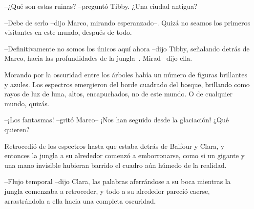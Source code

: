 {--¿Qué son estas ruinas? --preguntó Tibby. ¿Una ciudad antigua?}

{--Debe de serlo --dijo Marco, mirando esperanzado--. Quizá no seamos los
primeros visitantes en este mundo, después de todo.}

{--Definitivamente no somos los únicos aquí ahora --dijo Tibby, señalando
 detrás de Marco, hacia las profundidades de la jungla--. Mirad --dijo
ella.}

{Morando por la oscuridad entre los árboles había un número de figuras
 brillantes y azules. Los espectros emergieron del borde cuadrado del
 bosque, brillando como rayos de luz de luna, altos, encapuchados, no de
este mundo. O de cualquier mundo, quizás.}

{--¡Los fantasmas! --gritó Marco-- ¡Nos han seguido desde la glaciación!
¿Qué quieren?}

{Retrocedió de los espectros hasta que estaba detrás de Balfour y Clara,
 y entonces la jungla a su alrededor comenzó a emborronarse, como si un
 gigante y una mano invisible hubieran barrido el cuadro aún húmedo de la
realidad.}

{--Flujo temporal --dijo Clara, las palabras aferrándose a su boca
 mientras la jungla comenzaba a retroceder, y todo a su alrededor pareció
caerse, arrastrándola a ella hacia una completa oscuridad.}
